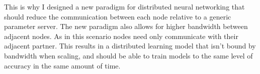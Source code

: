 This is why I designed a new paradigm for distributed neural networking that
should reduce the communication between each node relative to a generic
parameter server. The new paradigm also allows for higher bandwidth between
adjacent nodes. As in this scenario nodes need only communicate with their
adjacent partner. This results in a distributed learning model that isn't bound
by bandwidth when scaling, and should be able to train models to the same level
of accuracy in the same amount of time.










